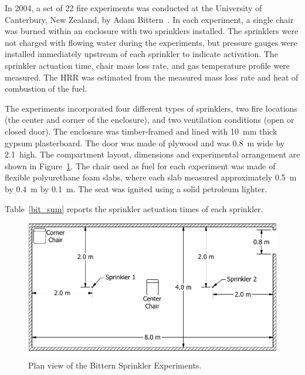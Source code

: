In 2004, a set of 22 fire experiments was conducted at the University of Canterbury, New Zealand, by Adam Bittern~\cite{Bittern:Thesis,Wade:FT2007}. In each experiment, a single chair was burned within an enclosure with two sprinklers installed. The sprinklers were not charged with flowing water during the experiments, but pressure gauges were installed immediately upstream of each sprinkler to indicate activation. The sprinkler actuation time, chair mass loss rate, and gas temperature profile were measured. The HRR was estimated from the measured mass loss rate and heat of combustion of the fuel.

The experiments incorporated four different types of sprinklers, two fire locations (the center and corner of the enclosure), and two ventilation conditions (open or closed door). The enclosure was timber-framed and lined with 10~mm thick gypsum plasterboard. The door was made of plywood and was 0.8~m wide by 2.1~high. The compartment layout, dimensions and experimental arrangement are shown in Figure~\ref{bit_plan}. The chair used as fuel for each experiment was made of flexible polyurethane foam slabs, where each slab measured approximately 0.5~m by 0.4~m by 0.1~m. The seat was ignited using a solid petroleum lighter.

Table~\ref{bit_sum} reports the sprinkler actuation times of each sprinkler.

\begin{figure}[h]
\centering
\includegraphics[width=\textwidth]{FIGURES/Bittern_Sprinkler_Experiments/Bittern_Sketch}
\caption[Plan view of the Bittern Sprinkler Experiments]{Plan view of the Bittern Sprinkler Experiments.}
\label{bit_plan}
\end{figure}


